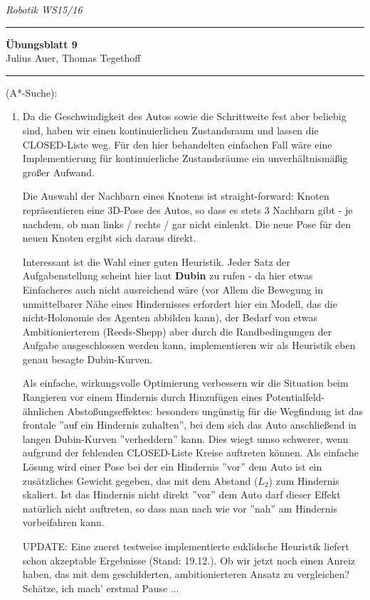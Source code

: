 \documentclass[a4paper, titlepage=false, parskip=full-, 10pt]{scrartcl}
\newcounter{tasknbr}
\newenvironment{task}[1]{{\bf Aufgabe \arabic {tasknbr}\stepcounter{tasknbr}} (#1):\begin{enumerate}}{\end{enumerate}}
\newcommand{\lecture}{Robotik WS15/16}
\newcommand{\tutor}{}
\newcommand{\assignmentnbr}{9}
\newcommand{\students}{Julius Auer, Thomas Tegethoff}
\begin{document}
  
{\small \textsl{\lecture \hfill \tutor}}
\hrule
\begin{center}
\textbf{Übungsblatt \assignmentnbr}\\
[\bigskipamount]
{\small \students}
\end{center}
\hrule

\begin{task}{A*-Suche}
\item[]
Da die Geschwindigkeit des Autos sowie die Schrittweite fest aber beliebig sind, haben wir einen kontinuierlichen Zustandsraum und lassen die CLOSED-Liste weg. Für den hier behandelten einfachen Fall wäre eine Implementierung für kontinuierliche Zustandsräume ein unverhältnismäßig großer Aufwand.

Die Auswahl der Nachbarn eines Knotens ist straight-forward: Knoten repräsentieren eine 3D-Pose des Autos, so dass es stets 3 Nachbarn gibt - je nachdem, ob man links / rechts / gar nicht einlenkt. Die neue Pose für den neuen Knoten ergibt sich daraus direkt.

Interessant ist die Wahl einer guten Heuristik. Jeder Satz der Aufgabenstellung scheint hier laut {\bf Dubin} zu rufen - da hier etwas Einfacheres auch nicht ausreichend wäre (vor Allem die Bewegung in unmittelbarer Nähe eines Hindernisses erfordert hier ein Modell, das die nicht-Holonomie des Agenten abbilden kann), der Bedarf von etwas Ambitionierterem (Reeds-Shepp) aber durch die Randbedingungen der Aufgabe ausgeschlossen werden kann, implementieren wir als Heuristik eben genau besagte Dubin-Kurven.

Als einfache, wirkungsvolle Optimierung verbessern wir die Situation beim Rangieren vor einem Hindernis durch Hinzufügen eines Potentialfeld-ähnlichen Abstoßungseffektes: besonders ungünstig für die Wegfindung ist das frontale ''auf ein Hindernis zuhalten'', bei dem sich das Auto anschließend in langen Dubin-Kurven ''verheddern'' kann. Dies wiegt umso schwerer, wenn aufgrund der fehlenden CLOSED-Liste Kreise auftreten können. Als einfache Lösung wird einer Pose bei der ein Hindernis ''vor'' dem Auto ist ein zusätzliches Gewicht gegeben, das mit dem Abstand ($L_2$) zum Hindernis skaliert. Ist das Hindernis nicht direkt ''vor'' dem Auto darf dieser Effekt natürlich nicht auftreten, so dass man nach wie vor ''nah'' am Hindernis vorbeifahren kann.

UPDATE: Eine zuerst testweise implementierte euklidsche Heuristik liefert schon akzeptable Ergebnisse (Stand: 19.12.). Ob wir jetzt noch einen Anreiz haben, das mit dem geschilderten, ambitionierteren Ansatz zu vergleichen? Schätze, ich mach' erstmal Pause ...


\end{task}
\end{document}
